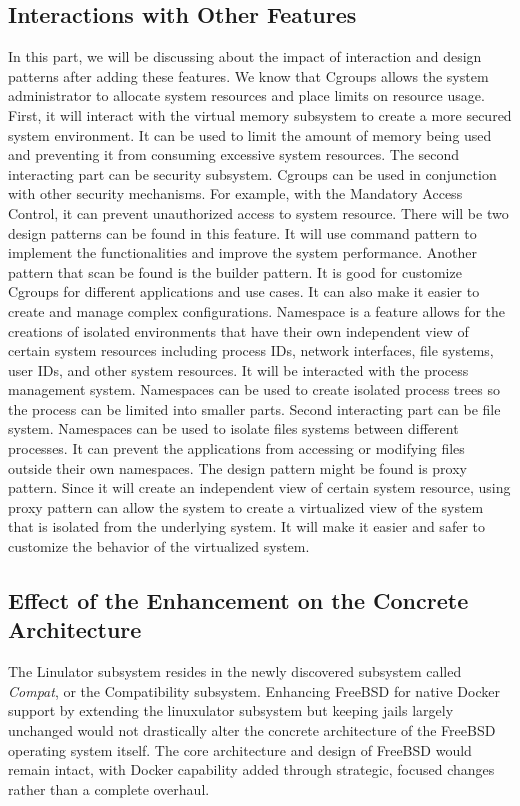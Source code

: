 \documentclass[12pt, dvipsnames, a4paper]{article}
\begin{document}
\subsection{Interactions with Other Features}
In this part, we will be discussing about the impact of interaction and design patterns after
adding these features. We know that Cgroups allows the system administrator to allocate
system resources and place limits on resource usage. First, it will interact with the virtual
memory subsystem to create a more secured system environment. It can be used to limit the
amount of memory being used and preventing it from consuming excessive system resources.
The second interacting part can be security subsystem. Cgroups can be used in conjunction with
other security mechanisms. For example, with the Mandatory Access Control, it can prevent
unauthorized access to system resource. There will be two design patterns can be found in this
feature. It will use command pattern to implement the functionalities and improve the system
performance. Another pattern that scan be found is the builder pattern. It is good for customize
Cgroups for different applications and use cases. It can also make it easier to create and
manage complex configurations.
Namespace is a feature allows for the creations of isolated environments that have their own
independent view of certain system resources including process IDs, network interfaces, file
systems, user IDs, and other system resources. It will be interacted with the process
management system. Namespaces can be used to create isolated process trees so the process
can be limited into smaller parts. Second interacting part can be file system. Namespaces can
be used to isolate files systems between different processes. It can prevent the applications
from accessing or modifying files outside their own namespaces. The design pattern might be
found is proxy pattern. Since it will create an independent view of certain system resource,
using proxy pattern can allow the system to create a virtualized view of the system that is
isolated from the underlying system. It will make it easier and safer to customize the behavior
of the virtualized system.
\clearpage

\subsection{Effect of the Enhancement on the Concrete Architecture}
The Linulator subsystem resides in the newly discovered subsystem called \emph{Compat}, or the Compatibility subsystem. Enhancing FreeBSD for native Docker support by extending the linuxulator subsystem but keeping jails largely unchanged would not drastically alter the concrete architecture of the FreeBSD operating system itself. The core architecture and design of FreeBSD would remain intact, with Docker capability added through strategic, focused changes rather than a complete overhaul.
\end{document}
